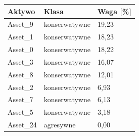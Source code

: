 \begin{tabular}{lll}
\toprule
Aktywo & Klasa & Waga [\%] \\
\midrule
Asset_9 & konserwatywne & 19{,}23 \\
Asset_1 & konserwatywne & 18{,}23 \\
Asset_0 & konserwatywne & 18{,}22 \\
Asset_3 & konserwatywne & 16{,}07 \\
Asset_8 & konserwatywne & 12{,}01 \\
Asset_2 & konserwatywne & 6{,}93 \\
Asset_7 & konserwatywne & 6{,}13 \\
Asset_5 & konserwatywne & 3{,}18 \\
Asset_24 & agresywne & 0{,}00 \\
\bottomrule
\end{tabular}

